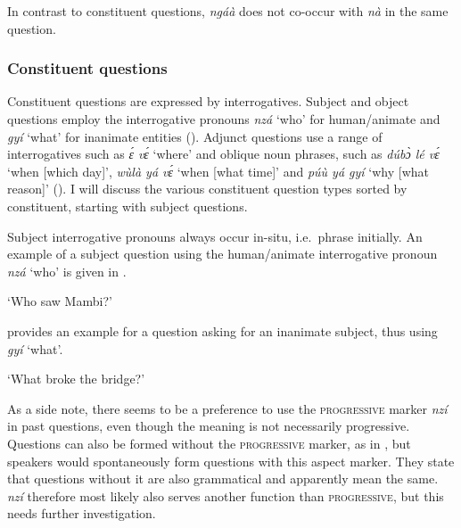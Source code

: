 \noindent  In contrast to constituent questions, {\itshape ngáà} does not co-occur with {\itshape nà} in the same question. 







\subsubsection{Constituent questions}
\label{sec:ConstituentQ}

Constituent questions are expressed by interrogatives. Subject and object questions employ the interrogative pronouns {\itshape nzá} `who' for human/animate and {\itshape gyí} `what' for inanimate entities (). Adjunct questions use a range of interrogatives such as {\itshape ɛ́ vɛ́} `where' and oblique noun phrases, such as {\itshape dúbɔ̀ lé vɛ́} `when [which day]', {\itshape wùlà yá vɛ́} `when [what time]' and {\itshape púù yá gyí} `why [what reason]' (). I will discuss the various constituent question types sorted by constituent, starting with subject questions. 


Subject interrogative pronouns always occur in-situ, i.e.\ phrase initially. An example of a subject question using the human/animate interrogative pronoun {\itshape nzá}  `who' is given in .


    \trans `Who saw Mambi?'
\z

\noindent {} provides an example for a question asking for an inanimate subject, thus using {\itshape gyí} `what'.

    \trans `What broke the bridge?'
\z

As a side note, there seems to be a  preference to use the \textsc{progressive} marker {\itshape nzí} in past questions, even though the meaning is not necessarily progressive. Questions can also be formed without the \textsc{progressive} marker, as in , but speakers would spontaneously form questions with this aspect marker. They state that questions without it are also grammatical and apparently mean the same. {\itshape nzí} therefore most likely also serves another function than \textsc{progressive}, but this needs further investigation.



